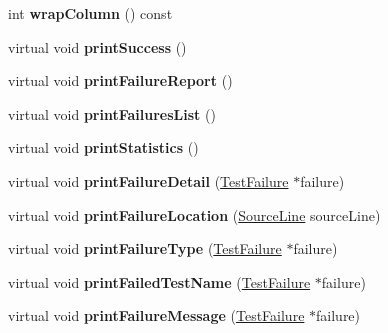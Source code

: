 \begin{DoxyCompactItemize}
\item 
int {\bfseries wrap\+Column} () const \hypertarget{class_compiler_outputter_a44a670371d545db99603ce88b59aa6c0}{}\label{class_compiler_outputter_a44a670371d545db99603ce88b59aa6c0}

\item 
virtual void {\bfseries print\+Success} ()\hypertarget{class_compiler_outputter_a5fb16745d10fddb67cbcbec270218589}{}\label{class_compiler_outputter_a5fb16745d10fddb67cbcbec270218589}

\item 
virtual void {\bfseries print\+Failure\+Report} ()\hypertarget{class_compiler_outputter_ab277e9b8c4af074593904dbc00853561}{}\label{class_compiler_outputter_ab277e9b8c4af074593904dbc00853561}

\item 
virtual void {\bfseries print\+Failures\+List} ()\hypertarget{class_compiler_outputter_a6919d4e1d44d03e50694aee73dc96d89}{}\label{class_compiler_outputter_a6919d4e1d44d03e50694aee73dc96d89}

\item 
virtual void {\bfseries print\+Statistics} ()\hypertarget{class_compiler_outputter_acc3eefc4776b975af3502ef9afaf8b3d}{}\label{class_compiler_outputter_acc3eefc4776b975af3502ef9afaf8b3d}

\item 
virtual void {\bfseries print\+Failure\+Detail} (\hyperlink{class_test_failure}{Test\+Failure} $\ast$failure)\hypertarget{class_compiler_outputter_a2a8fece8722cb0307a5f0f6cd0de41c3}{}\label{class_compiler_outputter_a2a8fece8722cb0307a5f0f6cd0de41c3}

\item 
virtual void {\bfseries print\+Failure\+Location} (\hyperlink{class_source_line}{Source\+Line} source\+Line)\hypertarget{class_compiler_outputter_aac88928b23fbae0b33b1624fa5696c31}{}\label{class_compiler_outputter_aac88928b23fbae0b33b1624fa5696c31}

\item 
virtual void {\bfseries print\+Failure\+Type} (\hyperlink{class_test_failure}{Test\+Failure} $\ast$failure)\hypertarget{class_compiler_outputter_ae836af9e969ced1ebdb399313df10250}{}\label{class_compiler_outputter_ae836af9e969ced1ebdb399313df10250}

\item 
virtual void {\bfseries print\+Failed\+Test\+Name} (\hyperlink{class_test_failure}{Test\+Failure} $\ast$failure)\hypertarget{class_compiler_outputter_a3e3fc6d7f2e98161144ab02f5f42dd9b}{}\label{class_compiler_outputter_a3e3fc6d7f2e98161144ab02f5f42dd9b}

\item 
virtual void {\bfseries print\+Failure\+Message} (\hyperlink{class_test_failure}{Test\+Failure} $\ast$failure)\hypertarget{class_compiler_outputter_a701ad438ff6a5a0af01acd1d43de4b6c}{}\label{class_compiler_outputter_a701ad438ff6a5a0af01acd1d43de4b6c}

\end{DoxyCompactItemize}
